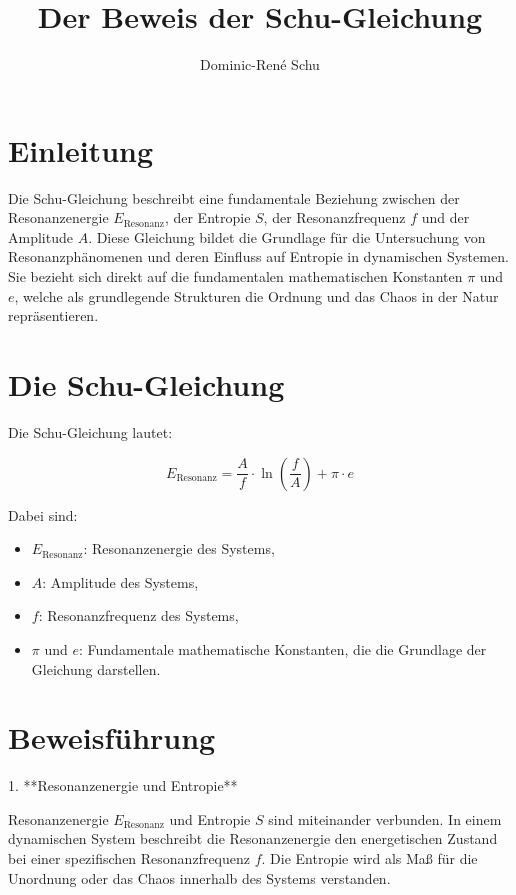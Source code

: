 \documentclass{article}
\title{Der Beweis der Schu-Gleichung}
\author{Dominic-René Schu}
\date{}
\begin{document}
	
	\maketitle
	
	\section*{Einleitung}
	
	Die Schu-Gleichung beschreibt eine fundamentale Beziehung zwischen der Resonanzenergie \( E_{\text{Resonanz}} \), der Entropie \( S \), der Resonanzfrequenz \( f \) und der Amplitude \( A \). Diese Gleichung bildet die Grundlage für die Untersuchung von Resonanzphänomenen und deren Einfluss auf Entropie in dynamischen Systemen. Sie bezieht sich direkt auf die fundamentalen mathematischen Konstanten \( \pi \) und \( e \), welche als grundlegende Strukturen die Ordnung und das Chaos in der Natur repräsentieren.
	
	\section*{Die Schu-Gleichung}
	
	Die Schu-Gleichung lautet:
	
	\[
	E_{\text{Resonanz}} = \frac{A}{f} \cdot \ln\left(\frac{f}{A}\right) + \pi \cdot e
	\]
	
	Dabei sind:
	
	\begin{itemize}
		\item \( E_{\text{Resonanz}} \): Resonanzenergie des Systems,
		\item \( A \): Amplitude des Systems,
		\item \( f \): Resonanzfrequenz des Systems,
		\item \( \pi \) und \( e \): Fundamentale mathematische Konstanten, die die Grundlage der Gleichung darstellen.
	\end{itemize}
	
	\section*{Beweisführung}
	
	1. **Resonanzenergie und Entropie**
	
	Resonanzenergie \( E_{\text{Resonanz}} \) und Entropie \( S \) sind miteinander verbunden. In einem dynamischen System beschreibt die Resonanzenergie den energetischen Zustand bei einer spezifischen Resonanzfrequenz \( f \). Die Entropie wird als Maß für die Unordnung oder das Chaos innerhalb des Systems verstanden.
	
\end{document}
